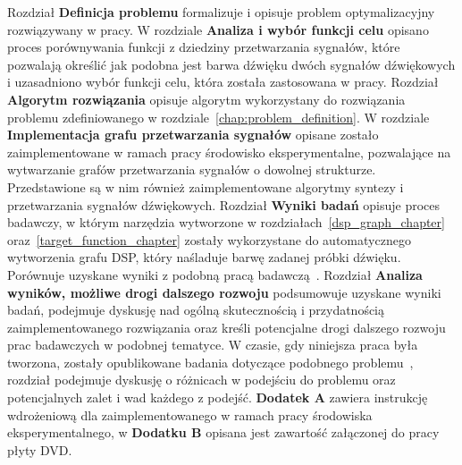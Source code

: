 Rozdział \textbf{Definicja problemu} formalizuje i opisuje problem optymalizacyjny rozwiązywany w pracy.
W rozdziale \textbf{Analiza i wybór funkcji celu} opisano proces porównywania funkcji z dziedziny przetwarzania sygnałów,
które pozwalają określić jak podobna jest barwa dźwięku dwóch sygnałów dźwiękowych i
uzasadniono wybór funkcji celu, która została zastosowana w pracy.
Rozdział \textbf{Algorytm rozwiązania} opisuje algorytm wykorzystany do rozwiązania problemu
zdefiniowanego w rozdziale~\ref{chap:problem_definition}.
W rozdziale \textbf{Implementacja grafu przetwarzania sygnałów} opisane zostało zaimplementowane w ramach pracy środowisko eksperymentalne,
pozwalające na wytwarzanie grafów przetwarzania sygnałów o dowolnej strukturze.
Przedstawione są w nim również zaimplementowane algorytmy syntezy i przetwarzania sygnałów dźwiękowych.
Rozdział \textbf{Wyniki badań} opisuje proces badawczy, w którym narzędzia wytworzone w
rozdziałach~\ref{dsp_graph_chapter} oraz~\ref{target_function_chapter}
zostały wykorzystane do automatycznego wytworzenia grafu DSP, który naśladuje barwę zadanej próbki dźwięku.
Porównuje uzyskane wyniki z podobną pracą badawczą~\cite{evolutionary_puredata}.
Rozdział \textbf{Analiza wyników, możliwe drogi dalszego rozwoju} podsumowuje uzyskane wyniki badań, podejmuje dyskusję nad ogólną skutecznością i przydatnością zaimplementowanego rozwiązania oraz
kreśli potencjalne drogi dalszego rozwoju prac badawczych w podobnej tematyce. W czasie, gdy niniejsza praca była tworzona, zostały opublikowane badania
dotyczące podobnego problemu~\cite{ieee_synth_programming}, rozdział podejmuje dyskusję o różnicach w podejściu do problemu oraz potencjalnych
zalet i wad każdego z podejść. \textbf{Dodatek A} zawiera instrukcję wdrożeniową dla
zaimplementowanego w ramach pracy środowiska eksperymentalnego, w \textbf{Dodatku B}
opisana jest zawartość załączonej do pracy płyty DVD\@.

